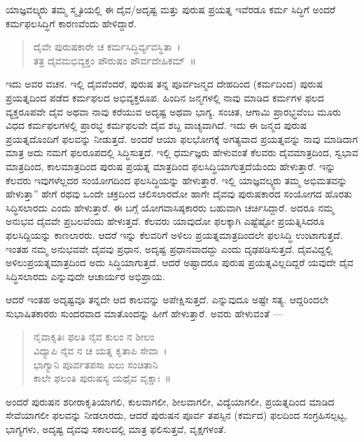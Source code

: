 {ಯಾಜ್ಞವಲ್ಕ್ಯರು ತಮ್ಮ ಸ್ಮೃತಿಯಲ್ಲಿ ಈ ದೈವ/ಅದೃಷ್ಟ ಮತ್ತು ಪುರುಷ ಪ್ರಯತ್ನ ಇವೆರಡೂ ಕರ್ಮ ಸಿದ್ಧಿಗೆ ಅಂದರೆ ಕರ್ಮಫಲಸಿದ್ಧಿಗೆ ಕಾರಣವೆಂದು ಹೇಳಿದ್ದಾರೆ.
\begin{verse}
ದೈವೇ ಪುರುಷಕಾರೇ ಚ ಕರ್ಮಸಿದ್ಧಿರ್ವ್ಯವಸ್ಥಿತಾ~।\\
ತತ್ರ ದೈವಮಭಿವ್ಯಕ್ತಂ ಪೌರುಷಂ ಪೌರ್ವದೇಹಿಕಮ್~॥
\end{verse}
ಇದು ಅವರ ವಚನ. ಇಲ್ಲಿ ದೈವವೆಂದರೆ, ಪುರುಷ ತನ್ನ ಪೂರ್ವಜನ್ಮದ ದೇಹದಿಂದ (ಕರ್ಮದಿಂದ) ಪುರುಷ ಪ್ರಯತ್ನದಿಂದ ಪಡೆದ ಕರ್ಮಫಲದ ಅಭಿವ್ಯಕ್ತರೂಪ. ಹಿಂದಿನ ಜನ್ಮಗಳಲ್ಲಿ ನಾವು ಮಾಡಿದ ಕರ್ಮಗಳ ಫಲದ ವ್ಯಕ್ತರೂಪವೇ ದೈವ ಅಥವಾ ನಾವು ಕರೆಯುವ ಅದೃಷ್ಟ ಅಥವಾ ಭಾಗ್ಯ. ಸಂಚಿತ, ಆಗಾಮಿ ಪ್ರಾರಭ್ಧವೆಂಬ ಮೂರು ವಿಧದ ಕರ್ಮಫಲಗಳಲ್ಲಿ ಪ್ರಾರಭ್ಧ ಕರ್ಮಫಲವೇ ದೈವ ಶಬ್ದ ವಾಚ್ಯವಾಗಿದೆ. ಇದು ಈ ಜನ್ಮದ ಪುರುಷ ಪ್ರಯತ್ನದೊಂದಿಗೆ ಫಲವನ್ನು ನೀಡುತ್ತದೆ. ಅಂದರೆ ಆಯಾ ಫಲಭೋಗಕ್ಕೆ ಅಗತ್ಯವಾದ ಪ್ರಯತ್ನವನ್ನು ನಾವು ಮಾಡಿದಾಗ ಮಾತ್ರ ಅದು ನಮಗೆ ಫಲರೂಪದಲ್ಲಿ ಸಿದ್ಧಿಸುತ್ತದೆ. ಇಲ್ಲಿ ಧರ್ಮಜ್ಞರು ಹೇಳುವಂತೆ ಕೆಲವರು ದೈವಮಾತ್ರದಿಂದ, ಸ್ವಭಾವ ಮಾತ್ರದಿಂದ, ಕಾಲಮಾತ್ರದಿಂದ ಪುರುಷ ಪ್ರಯತ್ನ ಮಾತ್ರದಿಂದ ಫಲಸಿದ್ಧಿಯಾಗುತ್ತದೆಯೆಂದು ಹೇಳುತ್ತಾರೆ. ಇನ್ನು ಕೆಲವರು ಇವುಗಳೆಲ್ಲದರ ಸಂಯೋಗದಿಂದ ಫಲಸಿದ್ಧಿಯನ್ನು ಹೇಳುತ್ತಾರೆ. ಇಲ್ಲಿ ಯಾಜ್ಞವಲ್ಕ್ಯರು ತಮ್ಮ ಅಭಿಮತವನ್ನು ಹೇಳುತ್ತಾ” ಹೇಗೆ ರಥವು ಒಂದೇ ಚಕ್ರದಿಂದ ಚಲಿಸಲಾರದೋ ಹಾಗೇ ದೈವವು ಪುರುಷಕಾರದ ಸಂಯೋಗದ ಹೊರತು ಸಿದ್ಧಿಸಲಾರದು ಎಂದು ಹೇಳುತ್ತಾರೆ. ಈ ಬಗ್ಗೆ ಯೋಗವಾಸಿಷ್ಠಕಾರರು ಬಹುವಾಗಿ ಚರ್ಚಿಸಿದ್ದಾರೆ. ಅದರೂ ನಮ್ಮ ಅನುಭವ ದೈವವೇ ಪ್ರಬಲವೆಂದು ಹೇಳುತ್ತದೆ. ಕೆಲವರು ಯಾವುದೋ ಫಲಕ್ಕಾಗಿ ಎಷ್ಟೆಷ್ಟೋ ಪ್ರಯತ್ನಿಸಿದರೂ ಫಲಸಿದ್ದಿಯನ್ನು ಕಾಣಲಾರರು. ಆದರೆ ಇನ್ನು ಕೆಲವರಿಗೆ ಅಳಿಲು ಪ್ರಯತ್ನಮಾತ್ರದಿಂದಲೇ ಫಲಸಿದ್ಧಿ ಉಂಟಾಗುತ್ತದೆ. ಇಂತಹ ನಮ್ಮ ಅನುಭವವೇ ದೈವವು ಪ್ರಧಾನ, ಅದೃಷ್ಟ ಪ್ರಧಾನವಾದದ್ದು ಎಂದು ದೃಢಪಡಿಸುತ್ತದೆ. ದೈವವಿದ್ದಲ್ಲಿ ಅಳಿಲುಪ್ರಯತ್ನಮಾತ್ರದಿಂದ ಅದು ಸಿದ್ಧಿಯಾಗುತ್ತದೆ. ಆದರೆ ಅಷ್ಟಾದರೂ ಪುರುಷ ಪ್ರಯತ್ನವಿಲ್ಲದಿದ್ದರೆ ಯವುದೇ ದೈವ ಸಿದ್ಧಿಸಲಾರದು ಎನ್ನುವುದೇ ಆಚಾರ್ಯರ ಅಭಿಪ್ರಾಯ. 

ಆದರೆ ಇಂತಹ ಅದೃಷ್ಟವೂ ತನ್ನದೇ ಆದ ಕಾಲವನ್ನು ಅಪೇಕ್ಷಿಸುತ್ತದೆ. ಎನ್ನುವುದೂ ಅಷ್ಟೇ ಸತ್ಯ. ಆದ್ದರಿಂದಲೇ ಸುಭಾಷಿತಕಾರರು ಸುಂದರವಾದ ಮಾತೊಂದನ್ನು ಹೀಗೆ ಹೇಳುತ್ತಾರೆ. ಅವರು ಹೇಳುವಂತೆ ––
\begin{verse}
ನೈವಾಕೃತಿಃ ಫಲತಿ ನೈವ ಕುಲಂ ನ ಶೀಲಂ \\ವಿದ್ಯಾಪಿ ನೈವ ನ ಚ ಯತ್ನ ಕೃತಾಪಿ ಸೇವಾ~।\\
ಭಾಗ್ಯಾನಿ ಪೂರ್ವತಪಸಾ ಖಲು ಸಂಚಿತಾನಿ \\ಕಾಲೇ ಫಲಂತಿ ಪುರುಷಸ್ಯ ಯಥೈವ ವೃಕ್ಷಾಃ~॥
\end{verse}
ಅಂದರೆ ಪುರುಷನ ಶರೀರಾಕೃತಿಯಾಗಲಿ, ಕುಲವಾಗಲೀ, ಶೀಲವಾಗಲೀ, ವಿದ್ಯೆಯಾಗಲೀ, ಪ್ರಯತ್ನದಿಂದ ಮಾಡಿದ ಸೇವೆಯಾಗಲೀ ಫಲವನ್ನು ನೀಡಲಾರದು, ಆದರೆ ಪುರುಷನ ಪೂರ್ವ ತಪಸ್ಸಿನ (ಕರ್ಮದ) ಫಲದಿಂದ ಸಂಗ್ರಹಿಸಲ್ಪಟ್ಟ, ಭಾಗ್ಯಗಳು, ಅದೃಷ್ಟ ದೈವವು ಸಕಾಲದಲ್ಲಿ ಮಾತ್ರ ಫಲಿಸುತ್ತವೆ, ವೃಕ್ಷಗಳಂತೆ. 

}

